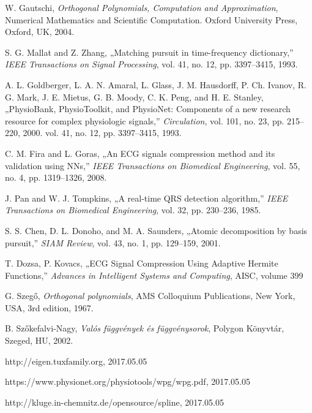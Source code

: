 \documentclass[oneside,titlepage,12pt,a4paper]{report}
\begin{document}
\begin{thebibliography}{9}
W. Gautschi,
\textit{Orthogonal Polynomials, Computation and Approximation},
Numerical Mathematics and Scientific Computation. Oxford University Press, Oxford,
UK, 2004.

S. G. Mallat and Z. Zhang,
„Matching pursuit in time-frequency dictionary,”
\textit{IEEE Transactions on Signal Processing},
vol. 41, no. 12, pp. 3397–3415, 1993.

A. L. Goldberger, L. A. N. Amaral, L. Glass, J. M. Hausdorff, P. Ch. Ivanov,
R. G. Mark, J. E. Mietus, G. B. Moody, C. K. Peng, and H. E. Stanley,
„PhysioBank, PhysioToolkit, and PhysioNet: Components of a new research resource
for complex physiologic signals,”
\textit{Circulation}, vol. 101, no. 23, pp. 215–220, 2000.
vol. 41, no. 12, pp. 3397–3415, 1993.

C. M. Fira and L. Goras,
„An ECG signals compression method and its validation using NNs,”
\textit{IEEE Transactions on Biomedical Engineering},
vol. 55, no. 4, pp. 1319–1326, 2008.

J. Pan and W. J. Tompkins,
„A real-time QRS detection algorithm,”
\textit{IEEE Transactions on Biomedical Engineering},
vol. 32, pp. 230–236, 1985.

S. S. Chen, D. L. Donoho, and M. A. Saunders,
„Atomic decomposition by basis pursuit,”
\textit{SIAM Review},
vol. 43, no. 1, pp. 129–159, 2001.

T. Dozsa, P. Kovacs,
„ECG Signal Compression Using Adaptive Hermite Functions,”
\textit{ Advances in Intelligent Systems and Computing},
AISC, volume 399

G. Szegő,
\textit{Orthogonal polynomials},
AMS Colloquium Publications, New York, USA, 3rd edition, 1967.

B. Szőkefalvi-Nagy,
\textit{Valós függvények és függvénysorok},
Polygon Könyvtár, Szeged, HU, 2002.

http://eigen.tuxfamily.org,
2017.05.05

https://www.physionet.org/physiotools/wpg/wpg.pdf,
2017.05.05

http://kluge.in-chemnitz.de/opensource/spline,
2017.05.05

\end{thebibliography}
\end{document}
